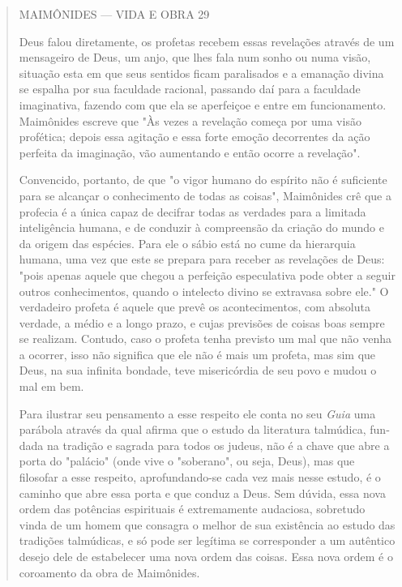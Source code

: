 \begin{quote}
MAIMÔNIDES --- VIDA E OBRA 29

Deus falou diretamente, os profetas recebem essas revelações através de
um mensageiro de Deus, um anjo, que lhes fala num sonho ou numa visão,
situa­ção esta em que seus sentidos ficam paralisados e a emanação
divina se espalha por sua faculdade racional, passando daí para a
faculdade imaginativa, fazendo com que ela se aperfeiçoe e entre em
funcionamento. Maimônides escreve que "Às vezes a revelação começa por
uma visão profética; depois essa agitação e essa forte emoção
decorrentes da ação perfeita da imaginação, vão aumentan­do e então
ocorre a revelação".

Convencido, portanto, de que "o vigor humano do espírito não é
suficiente para se alcançar o conhecimento de todas as coisas",
Maimônides crê que a profecia é a única capaz de decifrar todas as
verdades para a limitada inteligência humana, e de conduzir à
compreensão da criação do mundo e da origem das espécies. Para ele o
sábio está no cume da hierarquia humana, uma vez que este se prepara
para receber as revelações de Deus: "pois apenas aque­le que chegou a
perfeição especulativa pode obter a seguir outros conhecimen­tos, quando
o intelecto divino se extravasa sobre ele." O verdadeiro profeta é
aquele que prevê os acontecimentos, com absoluta verdade, a médio e a
lon­go prazo, e cujas previsões de coisas boas sempre se realizam.
Contudo, caso o profeta tenha previsto um mal que não venha a ocorrer,
isso não significa que ele não é mais um profeta, mas sim que Deus, na
sua infinita bondade, teve misericórdia de seu povo e mudou o mal em
bem.

Para ilustrar seu pensamento a esse respeito ele conta no seu
\emph{Guia} uma parábola através da qual afirma que o estudo da
literatura talmúdica, fun­dada na tradição e sagrada para todos os
judeus, não é a chave que abre a porta do "palácio" (onde vive o
"soberano", ou seja, Deus), mas que filosofar a esse respeito,
aprofundando-se cada vez mais nesse estudo, é o caminho que abre essa
porta e que conduz a Deus. Sem dúvida, essa nova ordem das potências
espirituais é extremamente audaciosa, sobretudo vinda de um homem que
con­sagra o melhor de sua existência ao estudo das tradições talmúdicas,
e só pode ser legítima se corresponder a um autêntico desejo dele de
estabelecer uma no­va ordem das coisas. Essa nova ordem é o coroamento
da obra de Maimônides.


\end{quote}
